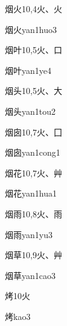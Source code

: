 \begin{entry}{烟火}{10,4}{⽕、⽕}
  \begin{phonetics}{烟火}{yan1huo3}
  \end{phonetics}
\end{entry}

\begin{entry}{烟叶}{10,5}{⽕、⼝}
  \begin{phonetics}{烟叶}{yan1ye4}
  \end{phonetics}
\end{entry}

\begin{entry}{烟头}{10,5}{⽕、⼤}
  \begin{phonetics}{烟头}{yan1tou2}
  \end{phonetics}
\end{entry}

\begin{entry}{烟囱}{10,7}{⽕、⼞}
  \begin{phonetics}{烟囱}{yan1cong1}
  \end{phonetics}
\end{entry}

\begin{entry}{烟花}{10,7}{⽕、⾋}
  \begin{phonetics}{烟花}{yan1hua1}
  \end{phonetics}
\end{entry}

\begin{entry}{烟雨}{10,8}{⽕、⾬}
  \begin{phonetics}{烟雨}{yan1yu3}
  \end{phonetics}
\end{entry}

\begin{entry}{烟草}{10,9}{⽕、⾋}
  \begin{phonetics}{烟草}{yan1cao3}
  \end{phonetics}
\end{entry}

\begin{entry}{烤}{10}{⽕}
  \begin{phonetics}{烤}{kao3}
  \end{phonetics}
\end{entry}

